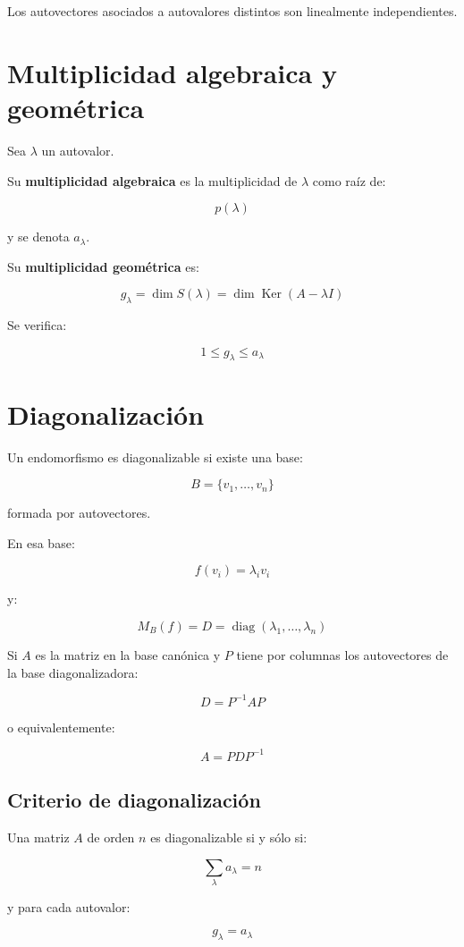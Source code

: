 \documentclass[11pt,a4paper]{article}
\newcommand{\Ker}{\operatorname{Ker}}
\newcommand{\diag}{\operatorname{diag}}
\begin{document}
Los autovectores asociados a autovalores distintos son linealmente independientes.

\section{Multiplicidad algebraica y geométrica}

Sea $\lambda$ un autovalor.

Su \textbf{multiplicidad algebraica} es la multiplicidad de $\lambda$ como raíz de:

\[
p(\lambda)
\]

y se denota $a_\lambda$.

Su \textbf{multiplicidad geométrica} es:

\[
\boxed{
g_\lambda=\dim S(\lambda)
=
\dim\Ker(A-\lambda I)
}
\]

Se verifica:

\[
\boxed{
1\leq g_\lambda\leq a_\lambda
}
\]

\section{Diagonalización}

Un endomorfismo es diagonalizable si existe una base:

\[
B=\{v_1,\ldots,v_n\}
\]

formada por autovectores.

En esa base:

\[
f(v_i)=\lambda_i v_i
\]

y:

\[
\boxed{
M_B(f)
=
D=
\diag(\lambda_1,\ldots,\lambda_n)
}
\]

Si $A$ es la matriz en la base canónica y $P$ tiene por columnas los autovectores de la base diagonalizadora:

\[
\boxed{
D=P^{-1}AP
}
\]

o equivalentemente:

\[
\boxed{
A=PDP^{-1}
}
\]

\subsection{Criterio de diagonalización}

Una matriz $A$ de orden $n$ es diagonalizable si y sólo si:

\[
\boxed{
\sum_\lambda a_\lambda=n
}
\]

y para cada autovalor:

\[
\boxed{
g_\lambda=a_\lambda
}
\]
\end{document}
